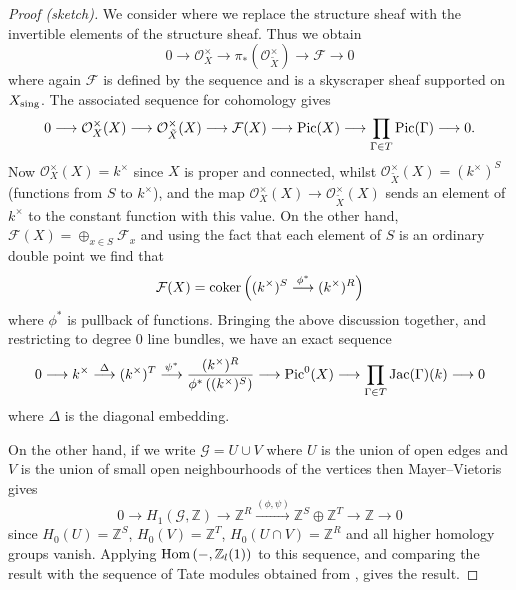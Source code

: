 \documentclass[12pt]{amsart}
\numberwithin{equation}{section}
\theoremstyle{remark}
\theoremstyle{definition}
\theoremstyle{definition}
\theoremstyle{definition}
\theoremstyle{definition}
\theoremstyle{definition}
\theoremstyle{definition}
\begin{document}
\begin{proof}[Proof (sketch)]
 We consider  where we replace the structure sheaf with the invertible elements of the structure sheaf. Thus we obtain
\begin{equation*}\label{second sheaf seq} 
0\longrightarrow \mathcal{O}_X^\times\longrightarrow \pi_*(\mathcal{O}_{\tilde{X}}^\times)\longrightarrow \mathcal{F}\longrightarrow 0
\end{equation*}
where again $\mathcal{F}$ is defined by the sequence and is a skyscraper sheaf supported on $X_\textup{sing}$. The associated sequence for cohomology gives 
\begin{equation*}\label{second sheaf seq} 
0\longrightarrow \mathcal{O}_X^\times (X)\longrightarrow \mathcal{O}_{\tilde{X}}^\times(X)\longrightarrow \mathcal{F}(X)\longrightarrow \textup{Pic}(X)\longrightarrow \prod_{\Gamma \in T}\textup{Pic}(\Gamma) \longrightarrow 0.
\end{equation*}
Now $\mathcal{O}_X^{\times}(X)=k^\times$ since $X$ is proper and connected, whilst $\mathcal{O}_{\tilde{X}}^\times(X)=(k^\times)^S$ (functions from $S$ to $k^\times$), and the map $\mathcal{O}_X^{\times}(X) \longrightarrow \mathcal{O}_{\tilde{X}}^\times(X)$ sends an element of $k^\times$ to the constant function with this value. On the other hand, $\mathcal{F}(X)=\oplus_{x\in S}\mathcal{F}_x$ and using the fact that each element of $S$ is an ordinary double point we find that 
\[\mathcal{F}(X)=\textup{coker}\left((k^\times)^S\stackrel{\phi^*}{\longrightarrow}(k^\times)^R\right)\]
where $\phi^*$ is pullback of functions.  Bringing the above discussion together, and restricting to degree $0$ line bundles, we have an exact sequence
\begin{equation}\label{good pic sequence}
0\longrightarrow k^\times \stackrel{\Delta}{\longrightarrow} (k^\times)^T\stackrel{\psi^*}{\longrightarrow}\frac{(k^\times)^R}{\phi^*\left((k^\times)^S\right)}\longrightarrow \textup{Pic}^0(X)\longrightarrow \prod_{\Gamma \in T}\textup{Jac}(\Gamma)(k)\longrightarrow 0
\end{equation}
where $\Delta$ is the diagonal embedding.

On the other hand, if we write $\mathcal{G}=U\cup V$ where $U$ is the union of open edges and $V$ is the union of small open neighbourhoods of the vertices then Mayer--Vietoris gives 
\begin{equation}
0\longrightarrow H_1(\mathcal{G},\mathbb{Z})\longrightarrow \mathbb{Z}^R\stackrel{(\phi,\psi)}{\longrightarrow}\mathbb{Z}^{S}\oplus \mathbb{Z}^{T}\longrightarrow \mathbb{Z}\longrightarrow 0
\end{equation}
since $H_0(U)=\mathbb{Z}^S$, $H_0(V)=\mathbb{Z}^T$, $H_0(U\cap V)=\mathbb{Z}^R$ and all higher homology groups vanish. Applying $\textup{Hom}\left(-,\mathbb{Z}_l(1)\right)$ to this sequence, and comparing the result with the sequence of Tate modules obtained from , gives the result.
\end{proof}
\end{document}
